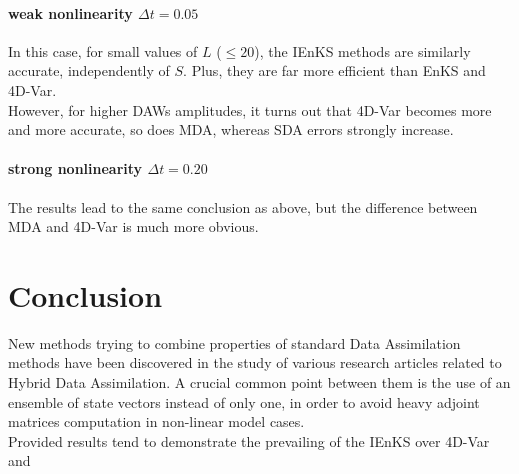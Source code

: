 \documentclass[a4,12pt]{article}
\numberwithin{equation}{section}
\begin{document}
\paragraph{weak nonlinearity $\Delta t = 0.05$}
In this case, for small values of $L$ ($\leq 20$), the IEnKS methods are similarly accurate, independently of $S$. Plus, they are far more efficient than EnKS and 4D-Var. \\
However, for higher DAWs amplitudes, it turns out that 4D-Var becomes more and more accurate, so does MDA, whereas SDA errors strongly increase.

\paragraph{strong nonlinearity $\Delta t = 0.20$}
The results lead to the same conclusion as above, but the difference between MDA and 4D-Var is much more obvious.


\section{Conclusion} 
New methods trying to combine properties of standard Data Assimilation methods have been discovered in the study of various research articles related to Hybrid Data Assimilation. A crucial common point between them is the use of an ensemble of state vectors instead of only one, in order to avoid heavy adjoint matrices computation in non-linear model cases. \\
Provided results tend to demonstrate the prevailing of the IEnKS over 4D-Var and

\newpage


\end{document}

